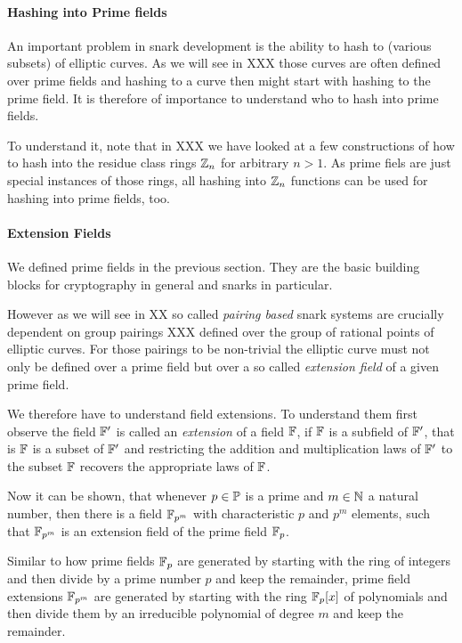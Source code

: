 \paragraph{Hashing into Prime fields} 
An important problem in snark development is the ability to hash to (various subsets) of elliptic curves. As we will see in XXX those curves are often defined over prime fields and hashing to a curve then might start with hashing to the prime field. It is therefore of importance to understand who to hash into prime fields.

To understand it, note that in XXX we have looked at a few constructions of how to hash into the residue class rings $\mathbb{Z}_n$ for arbitrary $n>1$. As prime fiels are just special instances of those rings, all hashing into $\mathbb{Z}_n$ functions can be used for hashing into prime fields, too.
\paragraph{Extension Fields}
We defined prime fields in the previous section. They are the basic building blocks for cryptography in general and snarks in particular.

However as we will see in XX so called \textit{pairing based} snark systems are crucially dependent on group pairings XXX defined over the group of rational points of elliptic curves. For those pairings to be non-trivial the elliptic curve must not only be defined over a prime field but over a so called \textit{extension field} of a given prime field.

We therefore have to understand field extensions. To understand them first observe the field $\mathbb{F}'$ is called an \textit{extension} of a field $\mathbb{F}$, if $\mathbb{F}$ is a subfield of $\mathbb{F}'$, that is $\mathbb{F}$ is a subset of $\mathbb{F}'$ and restricting the addition and multiplication laws of $\mathbb{F}'$ to the subset $\mathbb{F}$ recovers the appropriate laws of $\mathbb{F}$.

Now it can be shown, that whenever $p\in \mathbb{P}$ is a prime and $m\in\mathbb{N}$ a natural number, then there is a field $\mathbb{F}_{p^m}$ with characteristic $p$ and $p^m$ elements, such that $\mathbb{F}_{p^m}$ is an extension field of the prime field $\mathbb{F}_p$.

Similar to how prime fields $\mathbb{F}_p$ are generated by starting with the ring of integers and then divide by a prime number $p$ and keep the remainder, prime field extensions $\mathbb{F}_{p^m}$ are generated by starting with the ring $\mathbb{F}_p[x]$ of polynomials and then divide them by an irreducible polynomial of degree $m$ and keep the remainder.

